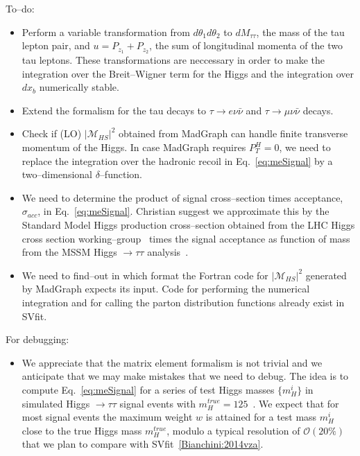To--do:
\begin{itemize}
\item Perform a variable transformation from $d\theta_{1} d\theta_{2}$ to $dM_{\tau\tau}$, the mass of the tau lepton pair,
  and $u = P_{z_{1}} + P_{z_{2}}$, the sum of longitudinal momenta of the two tau leptons.
  These transformations are neccessary in order to make the integration over the Breit--Wigner term for the Higgs and the integration over $dx_{b}$ numerically stable.
\item Extend the formalism for the tau decays to $\tau \rightarrow e \nu\bar{\nu}$ and $\tau \rightarrow \mu \nu\bar{\nu}$ decays.
\item Check if (LO) $\vert \mathcal{M}_{HS} \vert^2$ obtained from MadGraph can handle finite transverse momentum of the Higgs.
  In case MadGraph requires $P_{T}^{H} = 0$, we need to replace the integration over the hadronic recoil in Eq.~\ref{eq:meSignal} by a two--dimensional $\delta$--function.
\item We need to determine the product of signal cross--section times acceptance, $\sigma_{acc}$, in Eq.~\ref{eq:meSignal}.
  Christian suggest we approximate this by the Standard Model Higgs production cross--section obtained from the LHC Higgs cross section working--group~\cite{LHCHiggsCrossSectionWorkingGroup:2011ti}
  times the signal acceptance as function of mass from the MSSM Higgs $\rightarrow \tau\tau$ analysis~\cite{CMS_AN_2013-171}.
\item We need to find--out in which format the Fortran code for $\vert \mathcal{M}_{HS} \vert^2$ generated by MadGraph expects its input.
  Code for performing the numerical integration and for calling the parton distribution functions already exist in SVfit.
\end{itemize}

For debugging:
\begin{itemize}
\item We appreciate that the matrix element formalism is not trivial and we anticipate that we may make mistakes that we need to debug.
  The idea is to compute Eq.~\ref{eq:meSignal} for a series of test Higgs masses $\{ m_{H}^{i} \}$ in simulated Higgs $\rightarrow \tau\tau$ signal events with $m_{H}^{true} = 125$~\GeV.
  We expect that for most signal events the maximum weight $w$ is attained for a test mass $m_{H}^{i}$ close to the true Higgs mass $m_{H}^{true}$,
  modulo a typical resolution of $\mathcal{O}(20\%)$ that we plan to compare with SVfit~\ref{Bianchini:2014vza}.
\end{itemize}





